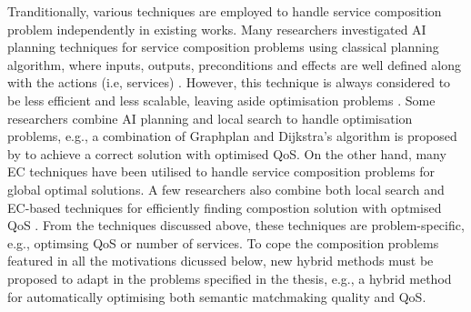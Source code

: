 Tranditionally, various techniques are employed to handle service composition problem independently in existing works. Many researchers investigated AI planning techniques for service composition problems using classical planning algorithm, where inputs, outputs, preconditions and effects are well defined along with the actions (i.e, services) \cite{markou2015non,peer2005web}. However, this technique is always considered to be less efficient and less scalable, leaving aside optimisation problems \cite{parejo2008qos}. Some researchers combine AI planning and local search to handle optimisation problems, e.g., a combination of Graphplan \cite{blum1997fast} and Dijkstra’s algorithm is proposed by \cite{feng2013dynamic} to achieve a correct solution with optimised QoS. On the other hand, many EC techniques have been utilised to handle service composition problems for global optimal solutions. A few researchers also combine both local search and EC-based techniques for efficiently finding compostion solution with optmised QoS \cite{parejo2008qos}. From the techniques discussed above, these techniques are problem-specific, e.g., optimsing QoS or number of services. To cope the composition problems featured in all the motivations dicussed below, new hybrid methods must be proposed to adapt in the problems specified in the thesis, e.g., a hybrid method for automatically optimising both semantic matchmaking quality and QoS. 

